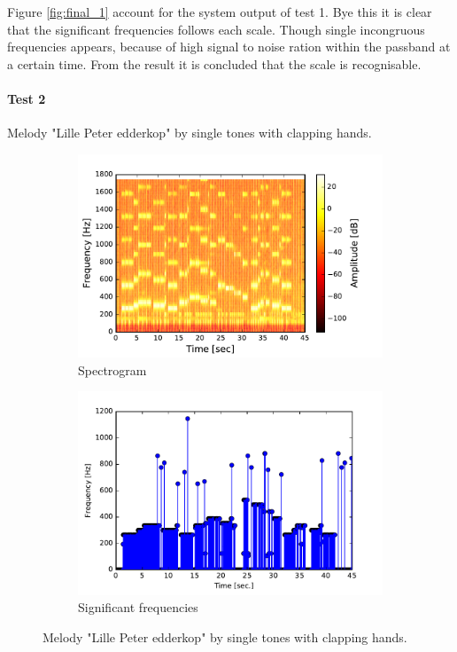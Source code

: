 Figure \ref{fig:final_1} account for the system output of test 1. Bye this it is clear that the significant frequencies follows each scale. Though single incongruous frequencies appears, because of high signal to noise ration within the passband at a certain time. From the result it is concluded that the scale is recognisable.  

\paragraph{Test 2} Melody "Lille Peter edderkop" by single tones with clapping hands.  
\begin{figure}[H]
\centering
\begin{subfigure}{0.49\textwidth}
\centering
\includegraphics[width=\textwidth]{figures/validation/systemtest/final_spec3.pdf}
\caption{Spectrogram}
\label{fig:final_spec2}
\end{subfigure}
\begin{subfigure}{0.49\textwidth}
\centering
\includegraphics[width=\textwidth]{figures/validation/systemtest/final_peak3.pdf}
\caption{Significant frequencies}
\label{fig:final_peak3}
\end{subfigure}
\label{fig:final_3}
\caption{Melody "Lille Peter edderkop" by single tones with clapping hands.}
\end{figure}  

